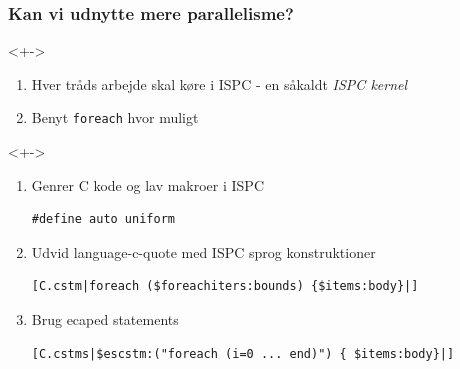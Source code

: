 \documentclass[t]{beamer}
\begin{document}
\begin{frame}[fragile]
  \frametitle{Kan vi udnytte mere parallelisme?}
  <+->
  \begin{enumerate}
    \item<+-> Hver tråds arbejde skal køre i ISPC - en såkaldt \textit{ISPC kernel}
    \item<+-> Benyt \texttt{foreach} hvor muligt
  \end{enumerate}
  <+->
  \begin{enumerate}
    \item<+-> Genrer C kode og lav makroer i ISPC
          \begin{lstlisting}[language=ispc, xleftmargin=-20mm]
            #define auto uniform
          \end{lstlisting}
    \item<+-> Udvid language-c-quote med ISPC sprog konstruktioner
          \begin{lstlisting}[xleftmargin=-20mm]
            [C.cstm|foreach ($foreachiters:bounds) {$items:body}|]
          \end{lstlisting}
    \item<+-> Brug ecaped statements
          \begin{lstlisting}[xleftmargin=-20mm]
            [C.cstms|$escstm:("foreach (i=0 ... end)") { $items:body}|]
          \end{lstlisting}
  \end{enumerate}


\end{frame}

\end{document}
